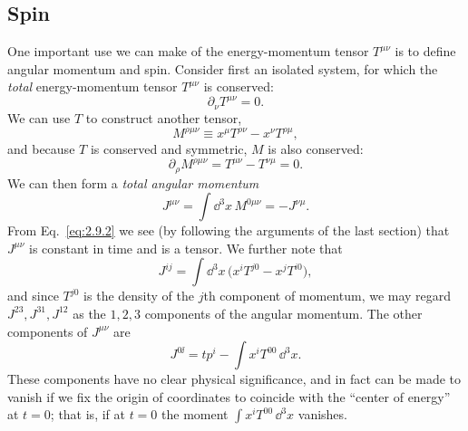 
\subsection{Spin}\label{sec:2.9}

One important use we can make of the energy-momentum tensor \(T^{\mu\nu}\) is
to define angular momentum and spin. Consider first an isolated system, for
which the \emph{total} energy-momentum tensor \(T^{\mu\nu}\) is conserved:
\[
  \partial_\nu T^{\mu\nu}=0 .
\]
We can use \(T\) to construct another tensor,
\begin{equation}
  M^{\rho\mu\nu}\equiv x^\mu T^{\rho\nu}-x^\nu T^{\rho\mu},
  \tag{2.9.1}\label{eq:2.9.1}
\end{equation}
and because \(T\) is conserved and symmetric, \(M\) is also conserved:
\begin{equation}
  \partial_\rho M^{\rho\mu\nu}
  =T^{\mu\nu}-T^{\nu\mu}=0 .
  \tag{2.9.2}\label{eq:2.9.2}
\end{equation}
We can then form a \emph{total angular momentum}
\begin{equation}
  J^{\mu\nu}=\int \dd^3x\,M^{0\mu\nu}=-J^{\nu\mu}.
  \tag{2.9.3}\label{eq:2.9.3}
\end{equation}
From Eq.~\eqref{eq:2.9.2} we see (by following the arguments of the last
section) that \(J^{\mu\nu}\) is constant in time and is a tensor. We further
note that
\[
  J^{ij}=\int \dd^3x\,
  \bigl(x^iT^{j0}-x^jT^{i0}\bigr),
\]
and since \(T^{j0}\) is the density of the \(j\)th component of momentum, we
may regard \(J^{23},J^{31},J^{12}\) as the \(1,2,3\) components of the angular
momentum. The other components of \(J^{\mu\nu}\) are
\[
  J^{0\ii}=tp^i-\int x^iT^{00}\,\dd^3x .
\]
These components have no clear physical significance, and in fact can be made
to vanish if we fix the origin of coordinates to coincide with the ``center of
energy'' at \(t=0\); that is, if at \(t=0\) the moment
\(\int x^iT^{00}\,\dd^3x\) vanishes.

